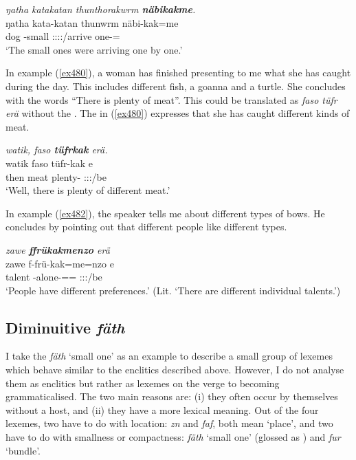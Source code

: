 \begin{exe}
	\ex \emph{ŋatha katakatan thunthorakwrm \textbf{näbikakme}.}\\
	\gll ŋatha kata-katan thunwrm näbi-kak=me\\
	dog \Redup-small \Stpl:\Sbj:\Pst:\Dur:\Venit/arrive one-\Distr=\Ins\\
	\trans `The small ones were arriving one by one.'
	\label{ex481}
\end{exe}

In example (\ref{ex480}), a woman has finished presenting to me what she has caught during the day. This includes different fish, a goanna and a turtle. She concludes with the words ``There is plenty of meat''. This could be translated as \emph{faso tüfr erä} without the . The  in (\ref{ex480}) expresses that she has caught different kinds of meat.

\begin{exe}
	\ex \emph{watik, faso \textbf{tüfrkak} erä.}\\
	\gll watik faso tüfr-kak e\\
	then meat plenty-\Distr{} \Stpl:\Sbj:\Nonpast:\Ipfv/be\\
	\trans `Well, there is plenty of different meat.'
	\label{ex480}
\end{exe}
	 
In example (\ref{ex482}), the speaker tells me about different types of bows. He concludes by pointing out that different people like different types.
	
\begin{exe}
	\ex \emph{zawe \textbf{ffrükakmenzo} erä}\\
	\gll zawe f-frü-kak=me=nzo e\\
	talent \Redup-alone-\Distr=\Ins=\Only{} \Stpl:\Sbj:\Nonpast:\Ipfv/be\\
	\trans `People have different preferences.' (Lit. `There are different individual talents.')
	\label{ex482}
\end{exe}

\subsection{Diminuitive \emph{fäth}}\label{diminuitivefaeth}

I take the  \emph{fäth} `small one' as an example to describe a small group of lexemes which behave similar to the enclitics described above. However, I do not analyse them as enclitics but rather as lexemes on the verge to becoming grammaticalised. The two main reasons are: (i) they often occur by themselves without a host, and (ii) they have a more lexical meaning. Out of the four lexemes, two have to do with location: \emph{zn} and \emph{faf}, both mean `place', and two have to do with smallness or compactness: \emph{fäth} `small one' (glossed as \Dim) and \emph{fur} `bundle'.\\

